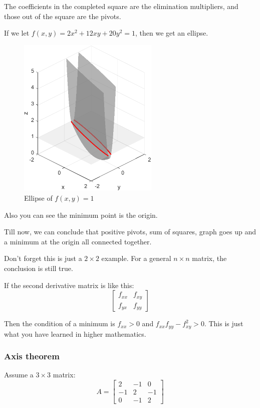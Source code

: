 \documentclass[12pt]{ctexart}
\begin{document}
The coefficients in the completed square are the elimination multipliers, and those
out of the square are the pivots.

If we let $f(x, y) = 2x^2 + 12xy + 20y^2 = 1$, then we get an ellipse.
\begin{figure}[H]
  \centering
  \includegraphics[width=0.6\textwidth]{assets/5.4 Positive definition matrix/Ellipse.png}
  \caption{Ellipse of $f(x, y) = 1$}
\end{figure}

Also you can see the minimum point is the origin.

Till now, we can conclude that positive pivots, sum of squares, graph goes up and a
minimum at the origin all connected together.

Don't forget this is just a $2 \times 2$ example. For a general $n \times n$ matrix,
the conclusion is still true.

If the second derivative matrix is like this:
\[
  \begin{bmatrix}
    f_{xx} & f_{xy} \\
    f_{yx} & f_{yy}
  \end{bmatrix}
\]

Then the condition of a minimum is $f_{xx} > 0$ and $f_{xx}f_{yy} - f_{xy}^2 > 0$.
This is just what you have learned in higher mathematics.

\subsubsection{\textbf{Axis theorem}}

Assume a $3 \times 3$ matrix:
\[
  A = \begin{bmatrix}
    2 & -1 & 0 \\
    -1 & 2 & -1 \\
    0 & -1 & 2
  \end{bmatrix}
\]
\end{document}
